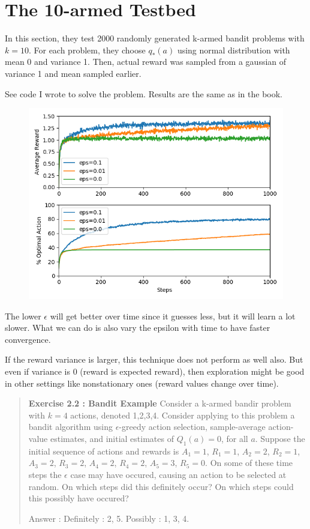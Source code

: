 \documentclass{article}
\begin{document}
\section{The 10-armed Testbed}

In this section, they test 2000 randomly generated k-armed bandit problems with $k=10$. For each problem, they choose $q_*(a)$ using normal distribution with mean 0 and variance 1. Then, actual reward was sampled from a gaussian of variance 1 and mean sampled earlier.

See code I wrote to solve the problem. Results are the same as in the book.

\begin{figure}[ht]
\centering
\includegraphics[width=.8\textwidth]{figures/results.png}
\end{figure}

The lower $\epsilon$ will get better over time since it guesses less, but it will learn a lot slower. What we can do is also vary the epsilon with time to have faster convergence.

If the reward variance is larger, this technique does not perform as well also. But even if variance is 0 (reward is expected reward), then exploration might be good in other settings like nonstationary ones (reward values change over time).

\begin{quote}
	
\textbf{Exercise 2.2 : Bandit Example} Consider a k-armed bandir problem with $k=4$ actions, denoted 1,2,3,4. Consider applying to this problem a bandit algorithm using $\epsilon$-greedy action selection, sample-average action-value estimates, and initial estimates of $Q_1(a)=0$, for all $a$. Suppose the initial sequence of actions and rewards is $A_1=1$, $R_1=1$, $A_2=2$, $R_2=1$, $A_3=2$, $R_3=2$, $A_4=2$, $R_4=2$, $A_5=3$, $R_5=0$. On some of these time steps the $\epsilon$ case may have occured, causing an action to be selected at random. On which steps did this definitely occur? On which steps could this possibly have occured?

Answer : Definitely : 2, 5.
Possibly : 1, 3, 4.

\end{quote}
\end{document}
